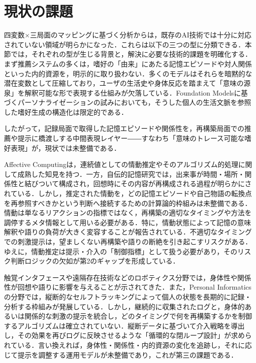 \documentclass[originalpaper]{jsaiart}
\begin{document}
\section{現状の課題}
四変数×三局面のマッピングに基づく分析からは，既存のAI技術では十分に対応されていない領域が明らかになった．これらは以下の三つの型に分類できる．本節では，それぞれの型が生じる背景と，解決に必要な技術的課題を明確化する．
まず推薦システムの多くは，嗜好の「由来」にあたる記憶エピソードや対人関係といった内的資源を，明示的に取り扱わない．多くのモデルはそれらを暗黙的な潜在変数として圧縮しており，ユーザの生活史や身体反応を踏まえて「意味の源泉」を解釈可能な形で表現する仕組みが欠落している．Foundation Modelsに基づくパーソナライゼーションの試み\cite{bommasani2021,park2023generative,lee2024personalizing}においても，そうした個人の生活文脈を参照した嗜好生成の構造化は限定的である．

したがって，記録局面で取得した記憶エピソードや関係性を，再構築局面での推薦や提示に橋渡しする中間表現レイヤー――すなわち「意味のトレース可能な嗜好表現」が，現状では未整備である．

Affective Computingは，連続値としての情動推定やそのアルゴリズム的処理に関して成熟した知見を持つ\cite{picard1997,cowie2011,douglascowie2008,ringeval2013}．一方，自伝的記憶研究では，出来事が時間・場所・関係性と結びついて構成され，回想時にその内容が再構成される過程が明らかにされている\cite{conway2000,bluck2002,pasupathi2001,rubin2009,mcadams2013,ricoeur1991}．しかし，推定された情動を，どの記憶エピソードや自己物語の転換点を再参照すべきかという判断へ接続するための計算論的枠組みは未整備である．情動は単なるリアクションの指標ではなく，再構築の適切なタイミングや方法を調停するメタ情報として用いる必要がある．特に，情動状態によって記憶の意味解釈や語りの負荷が大きく変容することが報告されている\cite{pasupathi2001,mcadams2013}．不適切なタイミングでの刺激提示は，望ましくない再構築や語りの断絶を引き起こすリスクがある．ゆえに，情動推定は提示・介入の「制御指標」として扱う必要があり，そのリスク判断ロジックの欠如が第2のギャップを形成している．

触覚インタフェースや遠隔存在技術などのロボティクス分野では，身体性や関係性が回想や語りに影響を与えることが示されてきた\cite{wada2007,shibata2011,ogawa2012,kidd2008}．また，Personal Informaticsの分野では，縦断的なセルフトラッキングによって個人の状態を長期的に記録・分析する枠組みが発展している\cite{li2010,choe2014,epstein2015,karkar2017,quadrana2018}．しかし，継続的に収集されたログと，身体的あるいは関係的な刺激の提示を統合し，どのタイミングで何を再構築するかを制御するアルゴリズムは確立されていない．縦断データに基づいて介入戦略を導出し，その効果を再びログに反映させるような「循環的な閉ループ設計」が求められている．言い換えれば，身体性・関係性・内的資源の変化を追跡し，それに応じて提示を調整する運用モデルが未整備であり，これが第三の課題である．
\end{document}
